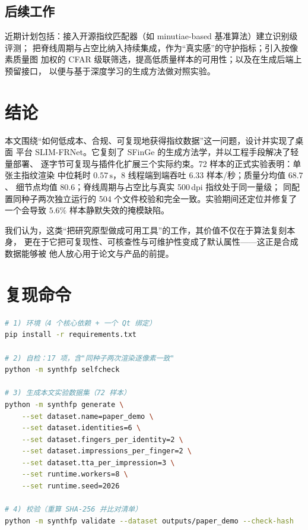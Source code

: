 \documentclass[UTF8, fontset=windows, a4paper, 11pt]{ctexart}
\newcommand{\name}{SLIM-FRNet}
\newcommand{\unit}[1]{\,\mathrm{#1}}
\begin{document}
\subsection{后续工作}

近期计划包括：接入开源指纹匹配器（如 minutiae-based 基准算法）建立识别级评测；
把脊线周期与占空比纳入持续集成，作为``真实感''的守护指标；引入按像素质量图
加权的 CFAR 级联筛选，提高低质量样本的可用性；以及在生成后端上预留接口，
以便与基于深度学习的生成方法做对照实验。

\section{结论}

本文围绕``如何低成本、合规、可复现地获得指纹数据''这一问题，设计并实现了桌面
平台 \name{}。它复刻了 SFinGe 的生成方法学，并以工程手段解决了轻量部署、
逐字节可复现与插件化扩展三个实际约束。72 样本的正式实验表明：单张主指纹渲染
中位耗时 $0.57\unit{s}$，8 线程端到端吞吐 $6.33$ 样本/秒；质量分均值 $68.7$、
细节点均值 $80.6$；脊线周期与占空比与真实 500\,dpi 指纹处于同一量级；
同配置同种子两次独立运行的 504 个文件校验和完全一致。实验期间还定位并修复了
一个会导致 $5.6\%$ 样本静默失效的掩模缺陷。

我们认为，这类``把研究原型做成可用工具''的工作，其价值不仅在于算法复刻本身，
更在于它把可复现性、可核查性与可维护性变成了默认属性——这正是合成数据能够被
他人放心用于论文与产品的前提。

{}


\appendix
\section{复现命令}

\begin{lstlisting}[language=bash, float=htbp, caption={从零复现本文数据集}, label={lst:repro}]
# 1) 环境（4 个核心依赖 + 一个 Qt 绑定）
pip install -r requirements.txt

# 2) 自检：17 项，含"同种子两次渲染逐像素一致"
python -m synthfp selfcheck

# 3) 生成本文实验数据集（72 样本）
python -m synthfp generate \
    --set dataset.name=paper_demo \
    --set dataset.identities=6 \
    --set dataset.fingers_per_identity=2 \
    --set dataset.impressions_per_finger=2 \
    --set dataset.tta_per_impression=3 \
    --set runtime.workers=8 \
    --set runtime.seed=2026

# 4) 校验（重算 SHA-256 并比对清单）
python -m synthfp validate --dataset outputs/paper_demo --check-hash
\end{lstlisting}
\end{document}
